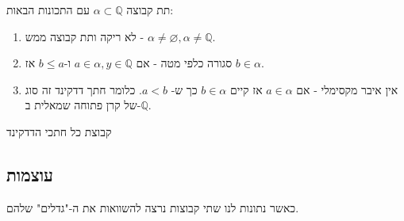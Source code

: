 \documentclass{tstextbook}
\begin{document}
\begin{definition}
תת קבוצה \(\alpha \subset \mathbb{Q}\) עם התכונות הבאות:

  \begin{enumerate}
    \item לא ריקה ותת קבוצה ממש - \(\alpha \neq \varnothing,\alpha \neq \mathbb{Q}\). 


    \item סגורה כלפי מטה - אם \(a \in \alpha, y \in \mathbb{Q}\) ו-\(b\leq a\) אז \(b \in \alpha\). 


    \item אין איבר מקסימלי - אם \(a \in \alpha\) אז קיים \(b \in \alpha\) כך ש- \(a < b\). 
כלומר חתך דדקינד זה סוג של קרן פתוחה שמאלית ב-\(\mathbb{Q}\).


  \end{enumerate}
\end{definition}
\begin{definition}
קבוצת כל חתכי הדדקינד

\end{definition}
\subsection{עוצמות}

כאשר נתונות לנו שתי קבוצות נרצה להשוואות את ה-"גדלים" שלהם.
\end{document}

